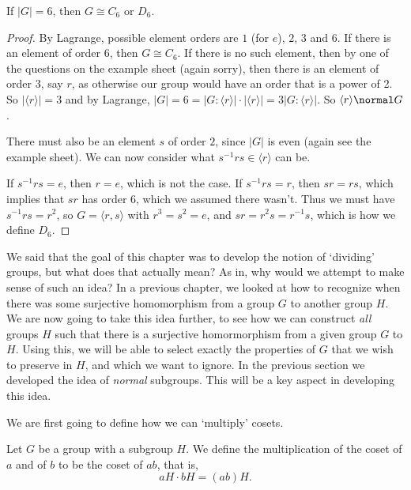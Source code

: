 \begin{proposition}
	If $|G| = 6$, then $G \cong C_6$ or $D_6$.
\end{proposition}
\begin{proof}
	By Lagrange, possible element orders are $1$ (for $e$), $2$, $3$ and $6$. If there is an element of order 6, then $G \cong C_6$. If there is no such element, then by one of the questions on the example sheet (again sorry), then there is an element of order $3$, say $r$, as otherwise our group would have an order that is a power of 2. So $|\langle r \rangle| = 3$ and by Lagrange, $|G| = 6 = |G: \langle r \rangle| \cdot |\langle r \rangle| = 3 |G: \langle r \rangle|$. So $\langle r \rangle \normal G$.

	There must also be an element $s$ of order $2$, since $|G|$ is even (again see the example sheet). We can now consider what $s^{-1} r s \in \langle r \rangle$ can be.

	If $s^{-1} r s = e$, then $r = e$, which is not the case. If $s^{-1} r s = r$, then $sr = rs$, which implies that $sr$ has order 6, which we assumed there wasn't. Thus we must have $s^{-1} r s = r^2$, so $G = \langle r, s \rangle$ with $r^3 = s^2 = e$, and $sr = r^2 s = r^{-1}s$, which is how we define $D_6$.
\end{proof}


We said that the goal of this chapter was to develop the notion of `dividing' groups, but what does that actually mean? As in, why would we attempt to make sense of such an idea?
In a previous chapter, we looked at how to recognize when there was some surjective homomorphism from a group $G$ to another group $H$.
We are now going to take this idea further, to see how we can construct \emph{all} groups $H$ such that there is a surjective homormorphism from a given group $G$ to $H$.
Using this, we will be able to select exactly the properties of $G$ that we wish to preserve in $H$, and which we want to ignore.
In the previous section we developed the idea of \emph{normal} subgroups. This will be a key aspect in developing this idea.

We are first going to define how we can `multiply' cosets.

\begin{definition}
Let $G$ be a group with a subgroup $H$. We define the multiplication of the coset of $a$ and of $b$ to be the coset of $ab$, that is,
$$
aH \cdot bH = (ab)H.
$$
\end{definition}


